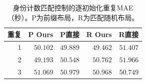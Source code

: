 \begin{table}[t]
\centering\footnotesize\setlength{\tabcolsep}{4pt}
\caption{身份计数匹配控制的逐初始化重复MAE（秒）。P为前缀布局，R为匹配随机布局。}\label{tab:coverage_seeds}
\begin{tabular}{rrrrr}\toprule
重复 & P Ours & P直接 & R Ours & R直接\\\midrule
1 & $50.102$ & $49.889$ & $49.462$ & $51.407$\\
2 & $49.193$ & $50.548$ & $50.762$ & $51.966$\\
3 & $51.069$ & $50.979$ & $50.968$ & $50.749$\\
\bottomrule\end{tabular}
\end{table}
